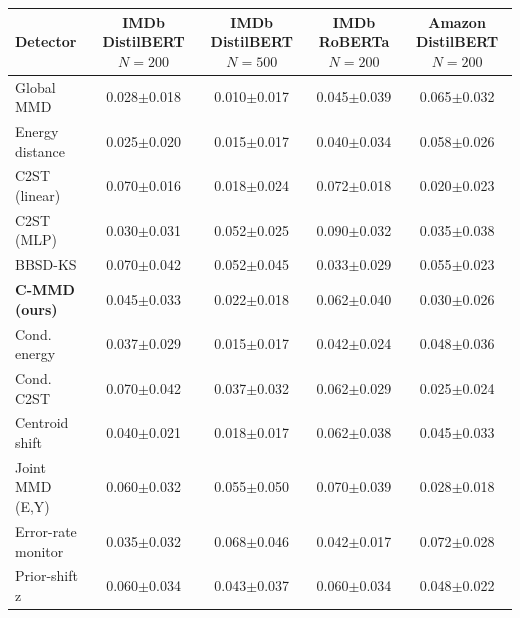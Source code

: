 \setlength{\tabcolsep}{4pt}\renewcommand{\arraystretch}{1.1}%
\begin{tabular}{lcccc}
\toprule
Detector & \makecell{IMDb\\DistilBERT\\$N{=}200$} & \makecell{IMDb\\DistilBERT\\$N{=}500$} & \makecell{IMDb\\RoBERTa\\$N{=}200$} & \makecell{Amazon\\DistilBERT\\$N{=}200$} \\
\midrule
Global MMD & 0.028$\pm$0.018 & 0.010$\pm$0.017 & 0.045$\pm$0.039 & 0.065$\pm$0.032 \\
Energy distance & 0.025$\pm$0.020 & 0.015$\pm$0.017 & 0.040$\pm$0.034 & 0.058$\pm$0.026 \\
C2ST (linear) & 0.070$\pm$0.016 & 0.018$\pm$0.024 & 0.072$\pm$0.018 & 0.020$\pm$0.023 \\
C2ST (MLP) & 0.030$\pm$0.031 & 0.052$\pm$0.025 & 0.090$\pm$0.032 & 0.035$\pm$0.038 \\
BBSD-KS & 0.070$\pm$0.042 & 0.052$\pm$0.045 & 0.033$\pm$0.029 & 0.055$\pm$0.023 \\
\textbf{C-MMD (ours)} & 0.045$\pm$0.033 & 0.022$\pm$0.018 & 0.062$\pm$0.040 & 0.030$\pm$0.026 \\
Cond. energy & 0.037$\pm$0.029 & 0.015$\pm$0.017 & 0.042$\pm$0.024 & 0.048$\pm$0.036 \\
Cond. C2ST & 0.070$\pm$0.042 & 0.037$\pm$0.032 & 0.062$\pm$0.029 & 0.025$\pm$0.024 \\
Centroid shift & 0.040$\pm$0.021 & 0.018$\pm$0.017 & 0.062$\pm$0.038 & 0.045$\pm$0.033 \\
Joint MMD (E,Y) & 0.060$\pm$0.032 & 0.055$\pm$0.050 & 0.070$\pm$0.039 & 0.028$\pm$0.018 \\
Error-rate monitor & 0.035$\pm$0.032 & 0.068$\pm$0.046 & 0.042$\pm$0.017 & 0.072$\pm$0.028 \\
Prior-shift z & 0.060$\pm$0.034 & 0.043$\pm$0.037 & 0.060$\pm$0.034 & 0.048$\pm$0.022 \\
\bottomrule
\end{tabular}